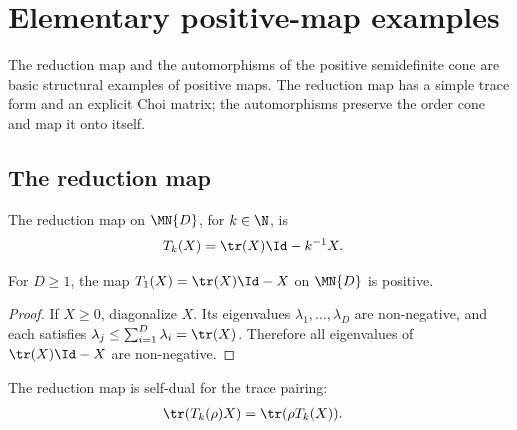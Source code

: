 \section{Elementary positive-map examples}

The reduction map and the automorphisms of the positive semidefinite cone are
basic structural examples of positive maps. The reduction map has a simple
trace form and an explicit Choi matrix; the automorphisms preserve the order
cone and map it onto itself.

\subsection{The reduction map}

\begin{definition}
    \label{def:reduction_map}
    \leanok
    The reduction map on $\MN{D}$, for $k\in\N$, is
    \begin{align}
        T_k(X)
         & =\tr(X)\Id-k^{-1}X.
        \label{eq:channel_reduction_map}
    \end{align}
\end{definition}

\begin{theorem}
    \label{thm:reduction_map_one_positive}
    \leanok
    For $D\ge 1$, the map $T_1(X)=\tr(X)\Id-X$ on $\MN{D}$ is positive.
\end{theorem}

\begin{proof}\leanok
    If $X\ge 0$, diagonalize $X$. Its eigenvalues
    $\lambda_1,\ldots,\lambda_D$ are non-negative, and each satisfies
    $\lambda_j\le \sum_{i=1}^D\lambda_i=\tr(X)$. Therefore all eigenvalues
    of $\tr(X)\Id-X$ are non-negative.
\end{proof}

\begin{theorem}
    \label{thm:reduction_map_self_dual}
    \leanok
    The reduction map is self-dual for the trace pairing:
    \begin{align}
        \tr(T_k(\rho)X)
         & =\tr(\rho T_k(X)).
        \label{eq:channel_reduction_self_dual}
    \end{align}
\end{theorem}

